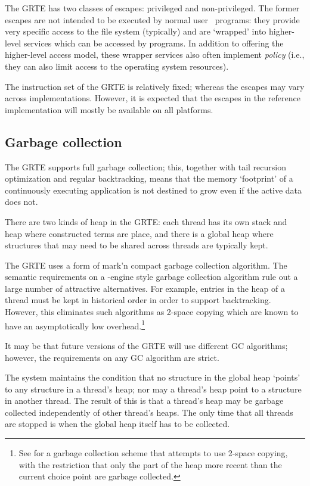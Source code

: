 The GRTE has two classes of escapes: privileged and non-privileged. The former escapes are not intended to be executed by normal user \go\ programs: they provide very specific access to the file system (typically) and are `wrapped' into higher-level services which can be accessed by \go programs. In addition to offering the higher-level access model, these wrapper services also often implement \emph{policy} (i.e., they can also limit access to the operating system resources).

The instruction set of the GRTE is relatively fixed; whereas the escapes may vary across implementations. However, it is expected that the escapes in the reference implementation will mostly be available on all platforms.



\subsection{Garbage collection}
\label{howitworks:gc}

The GRTE supports full garbage collection; this, together with tail recursion optimization and regular backtracking, means that the memory `footprint' of a continuously executing \go application is not destined to grow even if the active data does not.

There are two kinds of heap in the GRTE: each thread has its own stack and heap where constructed terms are place, and there is a global heap where structures that may need to be shared across threads are typically kept.

The GRTE uses a form of mark'n compact garbage collection algorithm. The semantic requirements on a \prolog-engine style garbage collection algorithm rule out a large number of attractive alternatives. For example, entries in the heap of a thread must be kept in historical order in order to support backtracking. However, this eliminates such algorithms as 2-space copying which are known to have an asymptotically low overhead.\footnote{See \cite{zhou:94} for a garbage collection scheme that attempts to use 2-space copying, with the restriction that only the part of the heap more recent than the current choice point are garbage collected.}

It may be that future versions of the \go GRTE will use different GC algorithms; however, the requirements on any GC algorithm are strict.

The system maintains the condition that no structure in the global heap `points' to any structure in a thread's heap; nor may a thread's heap point to a structure in another thread.  The result of this is that a thread's heap may be garbage collected independently of other thread's heaps. The only time that all threads are stopped is when the global heap itself has to be collected.

